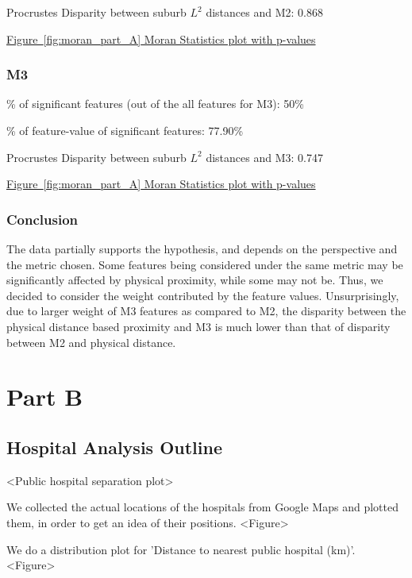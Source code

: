 \documentclass[
	a4paper, %
	10pt, %
	unnumberedsections, %
	twoside, %
]{LTJournalArticle}
\begin{document}
Procrustes Disparity between suburb $L^2$ distances and M2: 0.868

\hyperref[fig:moran_part_A]{Figure~\ref{fig:moran_part_A} Moran Statistics plot with p-values}


\subsubsection{M3}\leavevmode

\% of significant features (out of the all features for M3): 50\%

\% of feature-value of significant features: 77.90\%

Procrustes Disparity between suburb $L^2$ distances and M3: 0.747

\hyperref[fig:moran_part_A]{Figure~\ref{fig:moran_part_A} Moran Statistics plot with p-values}


\subsubsection{Conclusion}\leavevmode

The data partially supports the hypothesis, and depends on the perspective and the metric chosen. Some features being considered under the same metric may be significantly affected by physical proximity, while some may not be. Thus, we decided to consider the weight contributed by the feature values. Unsurprisingly, due to larger weight of M3 features as compared to M2, the disparity between the physical distance based proximity and M3 is much lower than that of disparity between M2 and physical distance.

\pagebreak

\section{Part B}


\subsection{Hospital Analysis Outline}

<Public hospital separation plot>

We collected the actual locations of the hospitals from Google Maps and plotted them, in order to get an idea of their positions. <Figure>

We do a distribution plot for 'Distance to nearest public hospital (km)'. <Figure>
\end{document}
